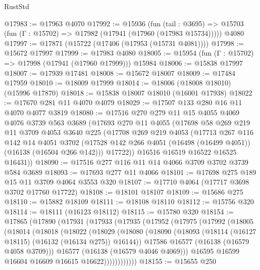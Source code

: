 \begin{lexlean}{RustStd}
\begin{coremodule}
@17983 := @17963 @4070
@17992 := @15936
    (fun (tail : @3695) => @15703 (fun (Γ : @15702) => @17982 (@17941 (@17960 (@17983 @15734)))))
    @4080
@17997 := @17871 (@15722 (@17406 (@17953 (@15731 @4081))))
@17998 := @15672 @17997
@17999 := @17983 @4080
@18005 := @15954 (fun (Γ : @15702) => @17998 (@17941 (@17960 @17999))) @15984
@18006 := @15838 @17997
@18007 := @17939 @17481
@18008 := @15672 @18007
@18009 := @17484 @17959
@18010 := @18009 @17999
@18014 := @18006 (@18008 @18010) (@15996 @17870)
@18018 := @15838 @18007 @18010 (@16001 @17938)
@18022 := @17670 @281 @11 @4070 @4079
@18029 := @17507 @133 @280 @16 @11 @4070 @4077 @3819
@18080 := @17516
    @270
    @279
    @11
    @15
    @4055
    @4069
    @4076
    @3739
    @563
    @3689
    (@17693
      @270
      @11
      @4055
      (@17698
        @58
        @269
        @219
        @11
        @3709
        @4053
        @3640
        @225
        (@17708
          @269
          @219
          @4053
          (@17713
            @267
            @116
            @142
            @14
            @4051
            @3702
            (@17528 @142 @266 @4051 (@16498 (@16499 @4051)) (@16138 (@16504 @266 @142)))
            @17722))
        @16516
        @16519
        @16522
        @16525
        @16431))
@18090 := @17516 @277 @116 @11 @14 @4066 @3709 @3702 @3739 @584 @3689
@18093 := @17693 @277 @11 @4066
@18101 := @17698 @275 @189 @15 @11 @3709 @4064 @3553 @320
@18107 := @17710 @4064 (@17717 @3698 @3702 @17760 @17722)
@18108 := @18101 @18107
@18109 := @15686 @275
@18110 := @15882 @18109
@18111 := @18108 @18110
@18112 := @15756 @320
@18114 := @18111 (@16123 @18112)
@18115 := @15780 @320
@18154 := @17865
    (@17890
      (@17931
        (@17933
          (@17935
            (@17952
              (@17975
                (@17992
                  (@18005
                    (@18014
                      (@18018
                        (@18022
                          (@18029
                            (@18080
                              (@18090
                                (@18093 (@18114 (@16127 @18115) (@16132 (@16134 @275)) @16144))
                                @17586
                                @16577
                                (@16138 (@16579 @4058 @3709)))
                              @16577
                              (@16138 (@16579 @4046 @4069)))
                            @16595
                            @16599
                            @16604
                            @16609
                            @16615
                            @16622))))))))))))
@18155 := @15655 @250

\end{coremodule}
\end{lexlean}
